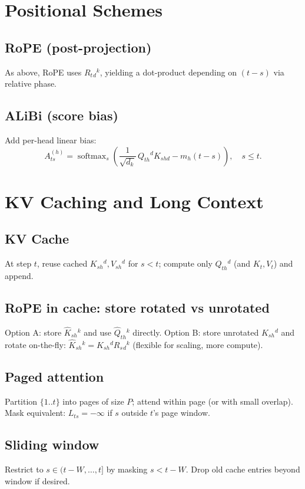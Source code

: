 \documentclass[11pt]{article}
\newcommand{\softmax}{\operatorname{softmax}}
\begin{document}
\section{Positional Schemes}
\subsection{RoPE (post-projection)}
As above, RoPE uses $R_{t}{}_{d}{}^{k}$, yielding a dot-product depending on $(t-s)$ via relative phase.

\subsection{ALiBi (score bias)}
Add per-head linear bias:
\[
A_{t s}^{(h)}=\softmax_{s}\!\left(\frac{1}{\sqrt{d_k}}\,Q_{t h}{}^{d}K_{s h d}-m_h (t-s)\right),\quad s\le t.
\]

\section{KV Caching and Long Context}
\subsection{KV Cache}
At step $t$, reuse cached $K_{s h}{}^{d},V_{s h}{}^{d}$ for $s<t$; compute only $Q_{t h}{}^{d}$ (and $K_{t},V_{t}$) and append.

\subsection{RoPE in cache: store rotated vs unrotated}
Option A: store $\widehat K_{s h}{}^{k}$ and use $\widehat Q_{t h}{}^{k}$ directly.
Option B: store unrotated $K_{s h}{}^{d}$ and rotate on-the-fly: $\widehat K_{s h}{}^{k}=K_{s h}{}^{d}R_{s}{}_{d}{}^{k}$ (flexible for scaling, more compute).

\subsection{Paged attention}
Partition $\{1..t\}$ into pages of size $P$; attend within page (or with small overlap). Mask equivalent: $L_{t s}=-\infty$ if $s$ outside $t$'s page window.

\subsection{Sliding window}
Restrict to $s\in (t-W, \ldots, t]$ by masking $s<t-W$. Drop old cache entries beyond window if desired.
\end{document}
